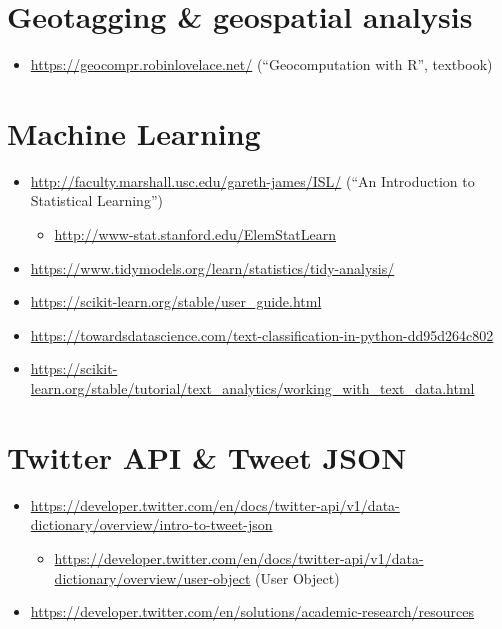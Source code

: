 \documentclass[
]{book}
\providecommand{\tightlist}{%
  \setlength{\itemsep}{0pt}\setlength{\parskip}{0pt}}
\begin{document}
\hypertarget{geotagging-geospatial-analysis}{%
\section{Geotagging \& geospatial analysis}\label{geotagging-geospatial-analysis}}

\begin{itemize}
\tightlist
\item
  \url{https://geocompr.robinlovelace.net/} (``Geocomputation with R'', textbook)
\end{itemize}

\hypertarget{machine-learning}{%
\section{Machine Learning}\label{machine-learning}}

\begin{itemize}
\tightlist
\item
  \url{http://faculty.marshall.usc.edu/gareth-james/ISL/} (``An Introduction to Statistical Learning'')

  \begin{itemize}
  \tightlist
  \item
    \url{http://www-stat.stanford.edu/ElemStatLearn}
  \end{itemize}
\item
  \url{https://www.tidymodels.org/learn/statistics/tidy-analysis/}
\item
  \url{https://scikit-learn.org/stable/user_guide.html}
\item
  \url{https://towardsdatascience.com/text-classification-in-python-dd95d264c802}
\item
  \url{https://scikit-learn.org/stable/tutorial/text_analytics/working_with_text_data.html}
\end{itemize}

\hypertarget{twitter-api-tweet-json}{%
\section{Twitter API \& Tweet JSON}\label{twitter-api-tweet-json}}

\begin{itemize}
\tightlist
\item
  \url{https://developer.twitter.com/en/docs/twitter-api/v1/data-dictionary/overview/intro-to-tweet-json}

  \begin{itemize}
  \tightlist
  \item
    \url{https://developer.twitter.com/en/docs/twitter-api/v1/data-dictionary/overview/user-object} (User Object)
  \end{itemize}
\item
  \url{https://developer.twitter.com/en/solutions/academic-research/resources}
\end{itemize}
\end{document}
